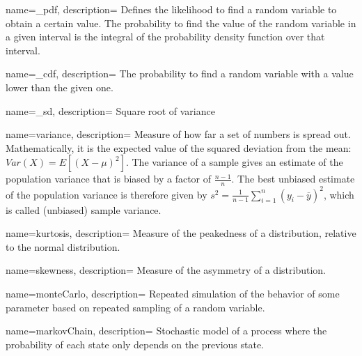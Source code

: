 {
    name=_pdf,
    description={ Defines the likelihood to find a random variable to obtain a certain
    value. The probability to find the value of the random variable in a given
    interval is the integral of the probability density function over that
    interval.}
}

{
    name=_cdf,
    description={ The probability to find a random variable with a value lower than the
    given one.}
}

{
    name=_sd,
    description={ Square root of variance}
}

{
    name=variance,
    description={ Measure of how far a set of numbers is spread out. Mathematically, it is
    the expected value of the squared deviation from the mean:
    $Var(X)=E[(X-\mu)^2]$. The variance of a sample gives an estimate of the
    population variance that is biased by a factor of $\frac{n-1}{n}$. The
    best unbiased estimate of the population variance is therefore given by
    $s^2 = \frac{1}{n-1} \sum_{i=1}^n \left(y_i - \overline{y} \right)^2 $,
    which is called (unbiased) sample variance.}
}

{
    name=kurtosis,
    description={ Measure of the peakedness of a distribution, relative to the
    normal distribution.}
}

{
    name=skewness,
    description={ Measure of the asymmetry of a distribution.}
}

{
    name=monteCarlo,
    description={ Repeated simulation of the behavior of some parameter based on repeated
    sampling of a random variable. }
}


{
    name=markovChain,
    description={ Stochastic model of a process where the probability of each state only
    depends on the previous state.}
}







